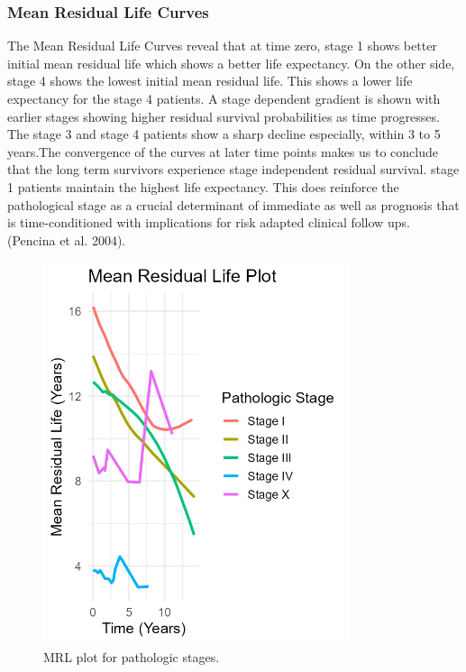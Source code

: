 \documentclass{article}
\begin{document}
\subsubsection{Mean Residual Life Curves}\label{mean-residual-life-curves-1}

The Mean Residual Life Curves reveal that at time zero, stage 1 shows better initial mean residual life which shows a better life expectancy. On the other side, stage 4 shows the lowest initial mean residual life. This shows a lower life expectancy for the stage 4 patients. A stage dependent gradient is shown with earlier stages showing higher residual survival probabilities as time progresses. The stage 3 and stage 4 patients show a sharp decline especially, within 3 to 5 years.The convergence of the curves at later time points makes us to conclude that the long term survivors experience stage independent residual survival. stage 1 patients maintain the highest life expectancy. This does reinforce the pathological stage as a crucial determinant of immediate as well as prognosis that is time-conditioned with implications for risk adapted clinical follow ups. (Pencina et al. 2004).

\begin{figure}[H]
  \centering
  \includegraphics[width=0.8\textwidth]{mrl_plot.png}
  \caption{MRL plot for pathologic stages.}
  \label{fig:mrl_plot}
\end{figure}
\end{document}
